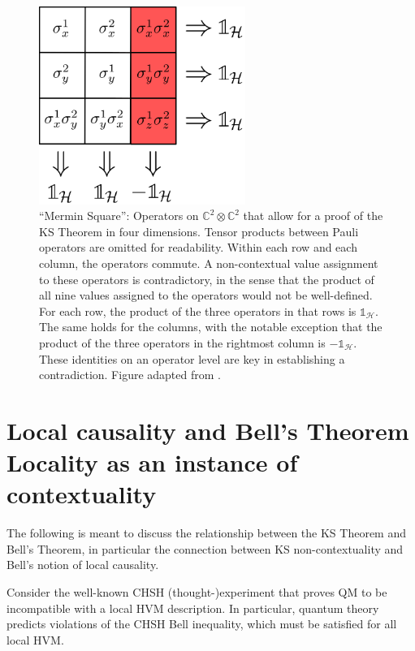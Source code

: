 \begin{figure}
    \centering
    \includegraphics[width=0.6\textwidth]{images/4dim.png}
    \caption{``Mermin Square'': Operators on $\mathbb{C}^{2}\otimes\mathbb{C}^{2}$ that allow for a proof of the KS Theorem in four dimensions. Tensor products between Pauli operators are omitted for readability. Within each row and each column, the operators commute. A non-contextual value assignment to these operators is contradictory, in the sense that the product of all nine values assigned to the operators would not be well-defined. For each row, the product of the three operators in that rows is $\mathbb{1}_\mathcal{H}$. The same holds for the columns, with the notable exception that the product of the three operators in the rightmost column is $-\mathbb{1}_\mathcal{H}$. These identities on an operator level are key in establishing a contradiction. Figure adapted from \cite{Mermin1993}.}
    \label{fig:4dim}
\end{figure}

\section[Local causality and Bell's Theorem\\ Locality as an instance of KS]{Local causality and Bell's Theorem\\ \large{Locality as an instance of contextuality}}

\label{sec:bell}
The following is meant to discuss the relationship between the KS Theorem and Bell's Theorem, in particular the connection between KS non-contextuality and Bell's notion of local causality. 

Consider the well-known CHSH (thought-)experiment \cite{Clauser1969,Colbeck2019,Spekkens2012} that proves QM to be incompatible with a local HVM description. In particular, quantum theory predicts violations of the CHSH Bell inequality, which must be satisfied for all local HVM.

